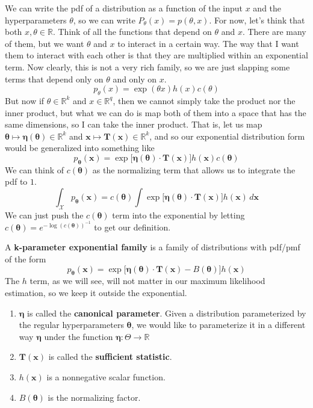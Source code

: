 \documentclass{article}
\begin{document}
    We can write the pdf of a distribution as a function of the input $x$ and the hyperparameters $\theta$, so we can write $P_\theta (x) = p(\theta, x)$. For now, let's think that both $x, \theta \in \mathbb{R}$. Think of all the functions that depend on $\theta$ and $x$. There are many of them, but we want $\theta$ and $x$ to interact in a certain way. The way that I want them to interact with each other is that they are multiplied within an exponential term. Now clearly, this is not a very rich family, so we are just slapping some terms that depend only on $\theta$ and only on $x$. 
    \[p_\theta (x) = \exp(\theta x) h(x) c(\theta)\]
    But now if $\theta \in \mathbb{R}^k$ and $x \in \mathbb{R}^q$, then we cannot simply take the product nor the inner product, but what we can do is map both of them into a space that has the same dimensions, so I can take the inner product. That is, let us map $\boldsymbol{\theta} \mapsto \boldsymbol{\eta}(\boldsymbol{\theta}) \in \mathbb{R}^k$ and $\mathbf{x} \mapsto \mathbf{T}(\mathbf{x}) \in \mathbb{R}^k$, and so 
    our exponential distribution form would be generalized into something like 
    \[p_{\boldsymbol{\theta}} (\mathbf{x}) = \exp\big[ \boldsymbol{\eta}(\boldsymbol{\theta}) \cdot \mathbf{T}(\mathbf{x}) \big] h(\mathbf{x}) c(\boldsymbol{\theta})\]
    We can think of $c(\boldsymbol{\theta})$ as the normalizing term that allows us to integrate the pdf to $1$. 
    \[\int_\mathcal{X} p_{\boldsymbol{\theta}} (\mathbf{x}) = c(\boldsymbol{\theta}) \int \exp\big[\boldsymbol{\eta}(\boldsymbol{\theta}) \cdot \mathbf{T}(\mathbf{x}) \big] h(\mathbf{x})  \,d\mathbf{x}\]
    We can just push the $c(\boldsymbol{\theta})$ term into the exponential by letting $c(\boldsymbol{\theta}) = e^{-\log(c(\boldsymbol{\theta}))^{-1}}$ to get our definition. 

    \begin{definition}
      A \textbf{k-parameter exponential family} is a family of distributions with pdf/pmf of the form 
      \[p_{\boldsymbol{\theta}} (\mathbf{x}) = \exp\big[ \boldsymbol{\eta}(\boldsymbol{\theta}) \cdot \mathbf{T}(\mathbf{x}) - B(\boldsymbol{\theta}) \big] h(\mathbf{x})\]
      The $h$ term, as we will see, will not matter in our maximum likelihood estimation, so we keep it outside the exponential. 
      \begin{enumerate}
        \item $\boldsymbol{\eta}$ is called the \textbf{canonical parameter}. Given a distribution parameterized by the regular hyperparameters $\boldsymbol{\theta}$, we would like to parameterize it in a different way $\boldsymbol{\eta}$ under the function $\boldsymbol{\eta}: \Theta \rightarrow \mathbb{R}$
        \item $\mathbf{T}(\mathbf{x})$ is called the \textbf{sufficient statistic}. 
        \item $h(\mathbf{x})$ is a nonnegative scalar function. 
        \item $B(\boldsymbol{\theta})$ is the normalizing factor. 
      \end{enumerate}
    \end{definition}
\end{document}
